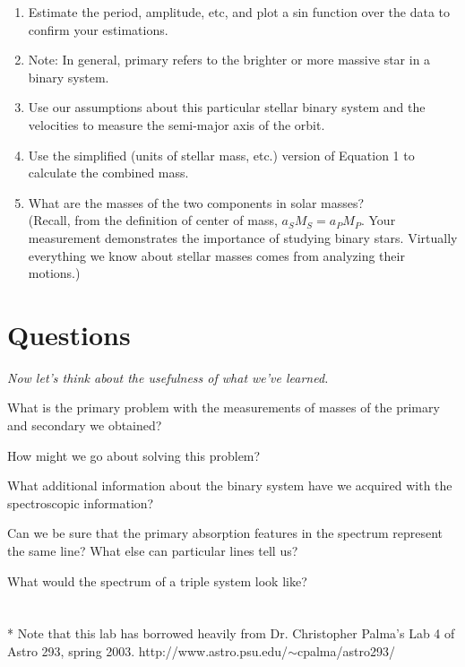 \documentclass[11pt]{article}
\begin{document}
\begin{enumerate}
\item Estimate the period, amplitude, etc, and plot a sin function over the data to confirm your estimations.
\item Note: In general, primary refers to the brighter or more massive star in a binary system.
\item Use our assumptions about this particular stellar binary system and the velocities to measure the semi-major axis of the orbit.
\item Use the simplified (units of stellar mass, etc.) version of Equation 1 to calculate the combined mass.
\item What are the masses of the two components in solar masses?\\
	(Recall, from the definition of center of mass, $a_{S}M_{S} = a_{P}M_{P}$. Your measurement demonstrates the importance of studying binary stars. Virtually everything we know about stellar masses comes from analyzing their motions.)
\end{enumerate}

\section{{\bf Questions}}
{\it Now let's think about the usefulness of what we've learned.}

What is the primary problem with the measurements of masses of the primary and secondary we obtained?

How might we go about solving this problem?

What additional information about the binary system have we acquired with the spectroscopic information?

Can we be sure that the primary absorption features in the spectrum represent the same line? What else can particular lines tell us?

What would the spectrum of a triple system look like?
\\
\\
\\



* Note that this lab has borrowed heavily from Dr. Christopher Palma's Lab 4 of Astro 293, spring 2003.
http://www.astro.psu.edu/$\sim$cpalma/astro293/
\end{document}
